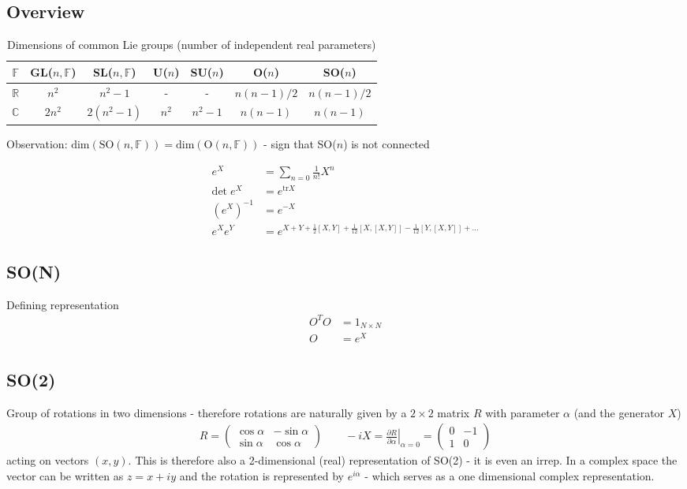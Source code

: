 \documentclass[../main.tex]{subfiles}
\begin{document}
\subsection{Overview}
\begin{table}[!h]
    \centering
    \begin{tabular}{c | c c c c c c}
        $\mathbb{F}$    & GL($n,\mathbb{F}$)    & SL($n,\mathbb{F}$) & U($n$) & SU($n$) & O($n$)     & SO($n$)     \\ \hline\hline
        $\mathbb{R}$    & $n^2$                 & $n^2-1$            & -      & -       & $n(n-1)/2$ & $n(n-1)/2$  \\
        $\mathbb{C}$    & $2n^2$                & $2(n^2-1)$         & $n^2$  & $n^2-1$ & $n(n-1)$   & $n(n-1)$    \\
    \end{tabular}
    \caption{Dimensions of common Lie groups (number of independent real parameters)}
    \label{tab:my_label}
\end{table}
Observation: $\text{dim}(\text{SO}(n,\mathbb{F}))=\text{dim}(\text{O}(n,\mathbb{F}))$  - sign that SO($n$) is not connected

\begin{align}
e^X&=\sum_{n=0}\frac{1}{n!}X^n\\
\text{det}\;e^X&=e^{\text{tr} X} \\
\left(e^X\right)^{-1}&=e^{-X}\\
e^Xe^Y&=e^{X+Y+\frac{1}{2}[X,Y]+\frac{1}{12}[X,[X,Y]]-\frac{1}{12}[Y,[X,Y]]+...}
\end{align}

\subsection{SO(N)}
Defining representation
\begin{align}
O^TO&=1_{N\times N}\\
O&=e^X
\end{align}

\subsection{SO(2)}
Group of rotations in two dimensions - therefore rotations are naturally given by a $2\times2$ matrix $R$ with parameter $\alpha$ (and the generator $X$)
\begin{align}
R=\left(\begin{matrix}
\cos\alpha  & -\sin\alpha\\
\sin\alpha & \cos\alpha
\end{matrix}\right)
\qquad
-iX=\left.\frac{\partial R}{\partial\alpha}\right|_{\alpha=0}=\left(\begin{matrix}
0 & -1\\
1 & 0
\end{matrix}\right)
\end{align}
acting on vectors $(x,y)$. This is therefore also a 2-dimensional (real) representation of SO(2) - it is even an irrep.
In a complex space the vector can be written as $z=x+iy$ and the rotation is represented by $e^{i\alpha}$ - which serves as a one dimensional complex representation.
\end{document}
